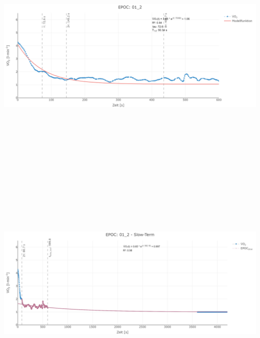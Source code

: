 \documentclass[
  letterpaper,
  DIV=11]{scrartcl}
\begin{document}
\includegraphics[width=11.45833in,height=4.6875in]{images/01_2_tau.png}
\includegraphics[width=11.45833in,height=4.6875in]{images/01_2_slow.png}
\end{document}
